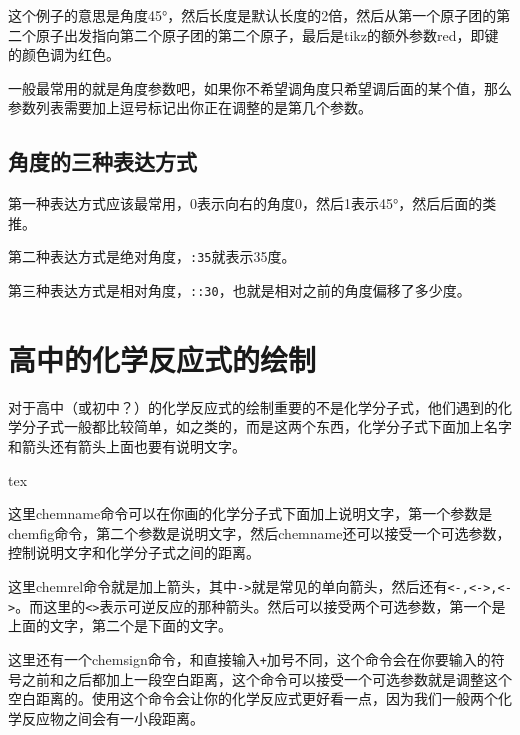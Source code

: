 \documentclass[11pt,oneside]{book}
\begin{document}

这个例子的意思是角度45\si{\degree}，然后长度是默认长度的2倍，然后从第一个原子团的第二个原子出发指向第二个原子团的第二个原子，最后是tikz的额外参数red，即键的颜色调为红色。

一般最常用的就是角度参数吧，如果你不希望调角度只希望调后面的某个值，那么参数列表需要加上逗号标记出你正在调整的是第几个参数。

\subsection{角度的三种表达方式}
第一种表达方式应该最常用，0表示向右的角度0，然后1表示45\si{\degree}，然后后面的类推。

第二种表达方式是绝对角度，\verb+:35+就表示35度。

第三种表达方式是相对角度，\verb+::30+，也就是相对之前的角度偏移了多少度。

\section{高中的化学反应式的绘制}
对于高中（或初中？）的化学反应式的绘制重要的不是化学分子式，他们遇到的化学分子式一般都比较简单，如之类的，而是这两个东西，化学分子式下面加上名字和箭头还有箭头上面也要有说明文字。

\begin{tcbcode}{tex}
\chemrel[电解][点燃]{<>}
\chemsign{+}
\end{tcbcode}

\chemrel[电解][点燃]{<>}
\chemsign{+}

这里chemname命令可以在你画的化学分子式下面加上说明文字，第一个参数是chemfig命令，第二个参数是说明文字，然后chemname还可以接受一个可选参数，控制说明文字和化学分子式之间的距离。

这里chemrel命令就是加上箭头，其中\verb+->+就是常见的单向箭头，然后还有\verb+<-,<->,<->+。而这里的\verb+<>+表示可逆反应的那种箭头。然后可以接受两个可选参数，第一个是上面的文字，第二个是下面的文字。

这里还有一个chemsign命令，和直接输入\verb|+|加号不同，这个命令会在你要输入的符号之前和之后都加上一段空白距离，这个命令可以接受一个可选参数就是调整这个空白距离的。使用这个命令会让你的化学反应式更好看一点，因为我们一般两个化学反应物之间会有一小段距离。
\end{document}
